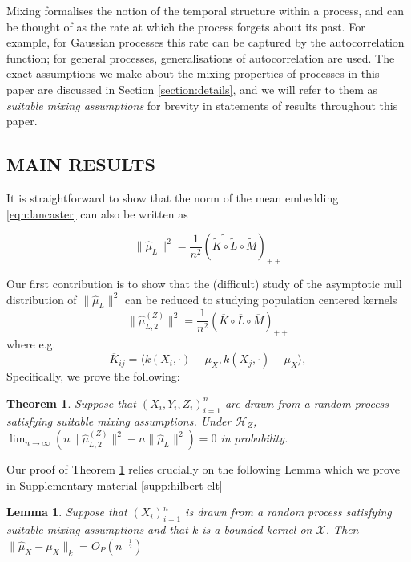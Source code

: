\documentclass[]{article}
\newtheorem{lemma}{Lemma}
\newtheorem{theorem}{Theorem}
\begin{document}
Mixing formalises the notion of the temporal structure within a process, and can be thought of as the rate at which the process forgets about its past. For example, for Gaussian processes this rate can be captured by the autocorrelation function; for general processes, generalisations of autocorrelation are used. The exact assumptions we make about the mixing properties of processes in this paper are discussed in Section \ref{section:details}, and we will refer to them as \textit{suitable mixing assumptions} for brevity in statements of results throughout this paper.   


\subsection{MAIN RESULTS}

It is straightforward to show that the norm of the mean embedding \eqref{eqn:lancaster} can also be written as

\[ \|\hat \mu_L\|^2 = \frac{1}{n^2}\left(\widetilde{\tilde{K}\circ\tilde{L}}\circ\tilde{M}\right)_{++}\]

Our first contribution is to show that the (difficult) study of the asymptotic null distribution of $ \|\hat \mu_L\|^2$ can be reduced to studying population centered kernels
\[
\| \hat \mu^{(Z)}_{L,2} \|^2 =\frac{1}{n^2}\left(\overline{\overline{K}\circ\overline{L}}\circ\overline{M}\right)_{++}
\]
where e.g. 
\[
\overline{K}_{ij} = \langle k(X_i,\cdot)-\mu_X, k(X_j,\cdot) -\mu_X \rangle,
\]
Specifically, we prove the following:
\begin{theorem}\label{theorem:norm-conv-in-prob} Suppose that $(X_i,Y_i,Z_i)_{i=1}^n$ are drawn from a random process satisfying suitable mixing assumptions. Under $\mathcal{H}_Z$, $\lim_{n \to \infty} ( n\| \hat \mu^{(Z)}_{L,2} \|^2 - n\|\hat \mu_L\|^2 ) =0 $ in probability.
\end{theorem}

Our proof of Theorem \ref{theorem:norm-conv-in-prob} relies crucially on the following Lemma which we prove in Supplementary material \ref{supp:hilbert-clt}
\begin{lemma}\label{lemma:hilbertCLT}
Suppose that $(X_i)_{i=1}^n$ is drawn from a random process satisfying suitable mixing assumptions and that $k$ is a bounded kernel on $\mathcal{X}$. Then $\|\hat\mu_X - \mu_X\|_k = O_P(n^{-\frac{1}{2}})$

\end{lemma}
\end{document}

